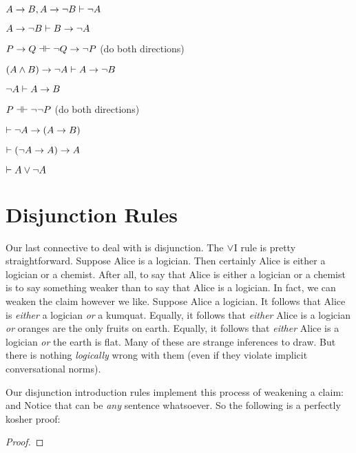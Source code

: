 \practiceproblems


\begin{earg}
\item $A \rightarrow B, A \rightarrow \neg B \vdash \neg A$
\item $A \rightarrow \neg B \vdash B \rightarrow \neg A$
\item $P \eif Q \pequiv \enot Q \eif \enot P$ (do both directions)
\item $(A \wedge B) \rightarrow \neg A \vdash A \rightarrow \neg B$
\item $\neg A \vdash A \rightarrow B$
\item $P \pequiv \enot \enot P$ (do both directions)
\item $\vdash \neg A \rightarrow( A \rightarrow B)$
\item $\vdash (\neg A \rightarrow A) \rightarrow A$
\item $\vdash A \vee \neg A$
\end{earg}



\section{Disjunction Rules}
Our last connective to deal with is disjunction.  The $\vee$I rule is pretty straightforward.  Suppose Alice is a logician. Then certainly Alice is either a logician or a chemist. After all, to say that Alice is either a logician or a chemist is to say something weaker than to say that Alice is a logician. In fact, we can weaken the claim however we like. Suppose Alice a logician. It follows that Alice is \emph{either} a logician \emph{or} a kumquat. Equally, it follows that \emph{either} Alice is a logician \emph{or} oranges are the only fruits on earth.  Equally, it follows that \emph{either} Alice is a logician \emph{or} the earth is flat. Many of these are strange inferences to draw. But there is nothing \emph{logically} wrong with them (even if they violate implicit conversational norms).

Our disjunction introduction rules implement this process of weakening a claim:
and
Notice that \meta{\psi} can be \emph{any} sentence whatsoever. So the following is a perfectly kosher proof:
\begin{proof}
\end{proof}


